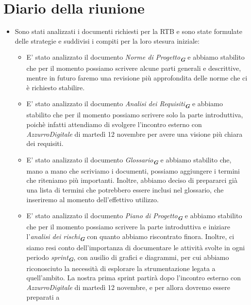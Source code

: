

\section{Diario della riunione}

\begin{itemize}
    \item Sono stati analizzati i documenti richiesti per la RTB e sono state formulate delle strategie e suddivisi i compiti per la loro stesura iniziale:
    \begin{itemize}
        \item E' stato analizzato il documento \emph{Norme di Progetto}\textsubscript{\textit{\textbf{G}}} e abbiamo stabilito che per il momento possiamo 
        scrivere alcune parti generali e descrittive, mentre in futuro faremo una revisione più approfondita delle norme che ci è richiesto stabilire.
        \item E' stato analizzato il documento \emph{Analisi dei Requisiti}\textsubscript{\textit{\textbf{G}}} e abbiamo stabilito che per il momento 
        possiamo scrivere solo la parte introduttiva, poichè infatti attendiamo di svolgere l'incontro esterno con \emph{AzzurroDigitale} di martedì 
        12 novembre per avere una visione più chiara dei requisiti.
        \item E' stato analizzato il documento \emph{Glossario}\textsubscript{\textit{\textbf{G}}} e abbiamo stabilito che, mano a mano che scriviamo i 
        documenti, possiamo aggiungere i termini che riteniamo più importanti. Inoltre, abbiamo deciso di prepararci già una lista di termini che potrebbero 
        essere inclusi nel glossario, che inseriremo al momento dell'effettivo utilizzo.
        \item E' stato analizzato il documento \emph{Piano di Progetto}\textsubscript{\textit{\textbf{G}}} e abbiamo stabilito che per il momento possiamo 
        scrivere la parte introduttiva e iniziare l'\emph{analisi dei rischi}\textsubscript{\textit{\textbf{G}}} con quanto abbiamo riscontrato finora. 
        Inoltre, ci siamo resi conto dell'importanza di documentare le attività svolte in ogni periodo \emph{sprint}\textsubscript{\textit{\textbf{G}}}, 
        con ausilio di grafici e diagrammi, per cui abbiamo riconosciuto la necessità di esplorare la strumentazione legata a quell'ambito.
        La nostra prima sprint partirà dopo l'incontro esterno con \emph{AzzurroDigitale} di martedì 12 novembre, e per allora dovremo essere preparati a

\end{itemize}
\end{itemize}
